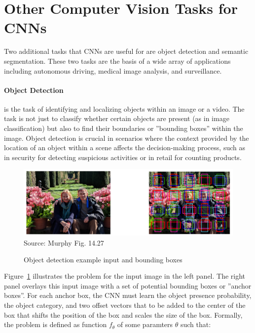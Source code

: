 \section{Other Computer Vision Tasks for CNNs}

Two additional tasks that CNNs are useful for are object detection and semantic segmentation. These two tasks are the basis of a wide array of applications including autonomous driving, medical image analysis, and surveillance. 

\paragraph*{Object Detection} is the task of identifying and localizing objects within an image or a video. The task is not just to classify whether certain objects are present (as in image classification) but also to find their boundaries or ''bounding boxes'' within the image. Object detection is crucial in scenarios where the context provided by the location of an object within a scene affects the decision-making process, such as in security for detecting suspicious activities or in retail for counting products.

\begin{figure}
\centering
\includegraphics[width=.9\textwidth]{screen10.png} \\

\scriptsize Source: Murphy Fig. 14.27
\normalsize
\caption{Object detection example input and bounding boxes}
\label{fig:screen10_chap16}
\end{figure}

Figure~\ref{fig:screen10_chap16} illustrates the problem for the input image in the left panel. The right panel overlays this input image with a set of potential bounding boxes or ''anchor boxes''. For each anchor box, the CNN must learn the object presence probability, the object category, and two offset vectors that to be added to the center of the box that shifts the position of the box and scales the size of the box. Formally, the problem is defined as function $f_\theta$ of some paramters $\theta$ such that:

